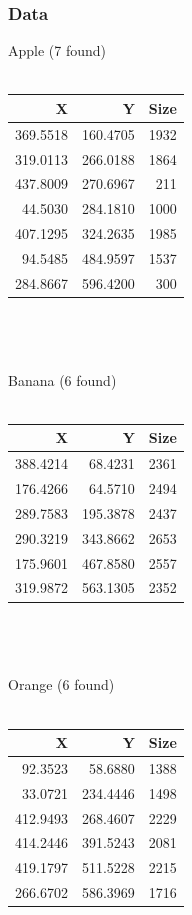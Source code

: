 \documentclass{article}
\begin{document}
\subsubsection{Data}
Apple (7 found)\\~\\
\begin{tabular}{ | r | r | r | }
\hline
\textbf{X} & \textbf{Y} & \textbf{Size}\\
\hline
369.5518 & 160.4705 & 1932\\
\hline
319.0113 & 266.0188 & 1864\\
\hline
437.8009 & 270.6967 & 211\\
\hline
44.5030 & 284.1810 & 1000\\
\hline
407.1295 & 324.2635 & 1985\\
\hline
94.5485 & 484.9597 & 1537\\
\hline
284.8667 & 596.4200 & 300\\
\hline
\end{tabular}
~\\~\\~\\
Banana (6 found)\\~\\
\begin{tabular}{ | r | r | r | }
\hline
\textbf{X} & \textbf{Y} & \textbf{Size}\\
\hline
388.4214 & 68.4231 & 2361\\
\hline
176.4266 & 64.5710 & 2494\\
\hline
289.7583 & 195.3878 & 2437\\
\hline
290.3219 & 343.8662 & 2653\\
\hline
175.9601 & 467.8580 & 2557\\
\hline
319.9872 & 563.1305 & 2352\\
\hline
\end{tabular}
~\\~\\~\\
Orange (6 found)\\~\\
\begin{tabular}{ | r | r | r | }
\hline
\textbf{X} & \textbf{Y} & \textbf{Size}\\
\hline
92.3523 & 58.6880 & 1388\\
\hline
33.0721 & 234.4446 & 1498\\
\hline
412.9493 & 268.4607 & 2229\\
\hline
414.2446 & 391.5243 & 2081\\
\hline
419.1797 & 511.5228 & 2215\\
\hline
266.6702 & 586.3969 & 1716\\
\hline
\end{tabular}
\end{document}
